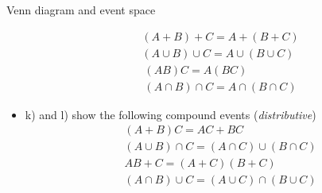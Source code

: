 \documentclass[8pt]{beamer}
\begin{document}
\begin{frame}{Venn diagram and event space}
\begin{minipage}{0.39\textwidth}
\begin{itemize}
                \vspace{-5pt}
                $$
                \begin{aligned}
                &(A + B) + C = A + (B + C) \\
                &(A \cup B) \cup C = A \cup (B \cup C)
                \end{aligned}
                $$
                $$
                \begin{aligned}
                &(AB)C = A(BC) \\
                &(A \cap B) \cap C = A \cap (B \cap C)
                \end{aligned}
                $$
            \item k) and l) show the following compound events (\emph{distributive})
                \vspace{-5pt}
                $$
                \begin{aligned}
                &(A + B)C = AC + BC \\
                &(A \cup B) \cap C = (A \cap C) \cup (B \cap C)
                \end{aligned}
                $$
                $$
                \begin{aligned}
                    &AB + C = (A + C)(B + C) \\
                    &(A \cap B) \cup C = (A \cup C) \cap (B \cup C)
                \end{aligned}
                $$
        \end{itemize}
    \end{minipage}

\end{frame}
\end{document}
